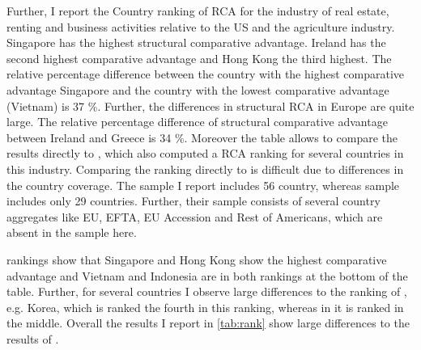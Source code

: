 Further,  I report the Country ranking of RCA for the industry of real estate, renting and business activities relative to the US and the agriculture industry.  Singapore has the highest structural comparative advantage. Ireland has the second highest comparative advantage and  Hong Kong the third highest. The relative percentage difference between the country with the highest comparative advantage Singapore and the country with the lowest comparative advantage (Vietnam) is 37 \%. Further, the differences in structural RCA in Europe are quite large. The relative percentage difference of structural comparative advantage between Ireland and Greece is 34 \%. %
Moreover the table allows to compare the results directly to \textcite{Koopman}, which also computed a RCA ranking for several countries in this industry.
 Comparing the ranking directly to \textcite[Figure 2, p.491]{Koopman} is difficult due to differences in the country coverage. The sample I report includes 56 country, whereas   \textcite{Koopman} sample includes only 29 countries. Further, their sample consists of several country aggregates like EU, EFTA, EU Accession and Rest of Americans, which are absent in the sample here. \par  rankings show that Singapore and Hong Kong show the highest comparative advantage and Vietnam and Indonesia are in both rankings at the bottom of the table. Further, for several countries I observe large differences to the ranking of \textcite{Koopman}, e.g.  Korea, which is ranked the fourth in this ranking, whereas in \citeauthor{Koopman} it is ranked in the middle. Overall the results I report in \cref{tab:rank} show large differences to the results of \textcite{Koopman}. %
